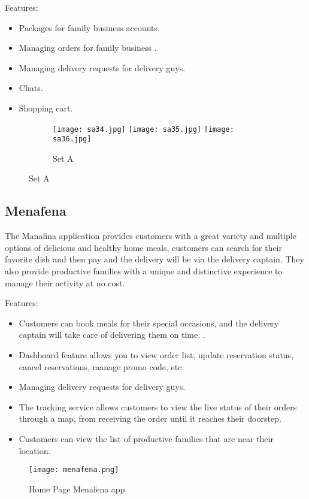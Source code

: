 \documentclass[11pt]{article}
\newcommand\tab[1][1cm]{\hspace*{#1}}
\begin{document}
Features: 
\begin{itemize}
\item Packages for family business accounts.
\item Managing orders for family business .
\item Managing delivery requests for delivery guys.
\item Chats.
\item Shopping cart.
\end{itemize}

\begin{figure}
  \begin{subfigure}{\linewidth}
  \texttt{[image: sa34.jpg]}\hfill
  \texttt{[image: sa35.jpg]}\hfill
  \texttt{[image: sa36.jpg]}
  \caption{Set A}
  \label{fig:seta-sn3}
  \end{subfigure}
\end{figure}

\clearpage 
\newpage 

\subsection{Menafena}
\tab The Manafina application provides customers with a great variety and multiple options of delicious and healthy home meals, customers can search for their favorite dish and then pay and the delivery will be via the delivery captain. They also provide productive families with a unique and distinctive experience to manage their activity at no cost. 

Features: 
\begin{itemize}
\item Customers can book meals for their special occasions, and the delivery captain will take care of delivering them on time.
.
\item Dashboard feature allows you to view order list, update reservation status, cancel reservations, manage promo code, etc.
\item Managing delivery requests for delivery guys.
\item The tracking service allows customers to view the live status of their orders through a map, from receiving the order until it reaches their doorstep.
\item Customers can view the list of productive families that are near their location.
\end{itemize}

\begin{figure} [h]
\begin{center}
\texttt{[image: menafena.png]}
\end{center}
\caption{Home Page Menafena app}
  \label{fig:menafena}
\end{figure}
\clearpage 
\newpage 
\end{document}
